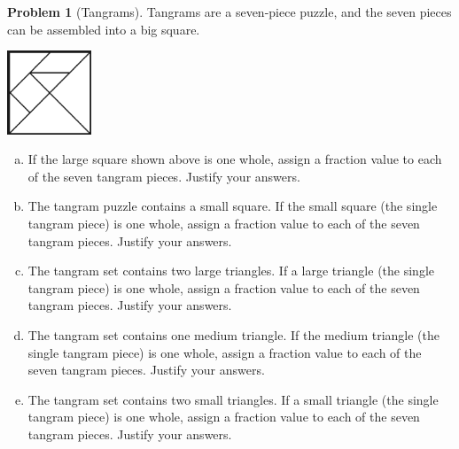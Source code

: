 \documentclass[10pt, reqno]{amsart}
\theoremstyle{remark}
\theoremstyle{definition}
\newtheorem{problem}{Problem}
\numberwithin{equation}{section}  %
\begin{document}
\begin{problem}[Tangrams]
Tangrams are  a seven-piece puzzle, and  the seven pieces can be assembled into a big square.

\begin{center}
\includegraphics[height=2.5cm]{tangramsquare}
\end{center}


\begin{enumerate} [(a)]
 \item
If the large square shown above is one whole, assign a fraction value to each of the seven tangram pieces.  Justify your answers. \\

 
\item
The tangram puzzle contains a small square.  If the small square (the single tangram piece)  is one whole, assign a fraction value to each of the seven tangram pieces.  Justify your answers. \\


 \item
The tangram set contains two large triangles.  If a large triangle (the single tangram piece)  is one whole, assign a fraction value to each of the seven tangram pieces.  Justify your answers. \\



 \item
The tangram set contains one medium triangle.  If the medium triangle (the single tangram piece)  is one whole, assign a fraction value to each of the seven tangram pieces.  Justify your answers. \\
 


 \item
The tangram set contains two small triangles.  If a small triangle (the single tangram piece)  is one whole, assign a fraction value to each of the seven tangram pieces.  Justify your answers. \\
 



 \end{enumerate}
 \end{problem}
\end{document}
